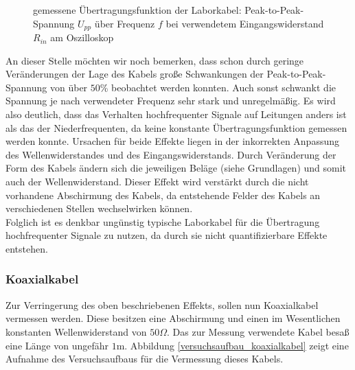 		\begin{figure}[H]
			\center
			
			\caption{\centering gemessene Übertragungsfunktion der Laborkabel: Peak-to-Peak-Spannung $U_{pp}$ über Frequenz $f$ bei verwendetem Eingangswiderstand $R_{in}$ am Oszilloskop} %
			\label{diagramm_laborkabel}
		\end{figure}

		An dieser Stelle möchten wir noch bemerken, dass schon durch geringe Veränderungen der Lage des Kabels große Schwankungen der Peak-to-Peak-Spannung von über $50$\% beobachtet werden konnten.
		Auch sonst schwankt die Spannung je nach verwendeter Frequenz sehr stark und unregelmäßig.
		Es wird also deutlich, dass das Verhalten hochfrequenter Signale auf Leitungen anders ist als das der Niederfrequenten, da keine konstante Übertragungsfunktion gemessen werden konnte.
		Ursachen für beide Effekte liegen in der inkorrekten Anpassung des Wellenwiderstandes und des Eingangswiderstands.
		Durch Veränderung der Form des Kabels ändern sich die jeweiligen Beläge (siehe Grundlagen) und somit auch der Wellenwiderstand.
		Dieser Effekt wird verstärkt durch die nicht vorhandene Abschirmung des Kabels, da entstehende Felder des Kabels an verschiedenen Stellen wechselwirken können. \\

		Folglich ist es denkbar ungünstig typische Laborkabel für die Übertragung hochfrequenter Signale zu nutzen, da durch sie nicht quantifizierbare Effekte entstehen.


	\subsubsection{Koaxialkabel} %
	\label{ssub:koaxialkabel}
	
		Zur Verringerung des oben beschriebenen Effekts, sollen nun Koaxialkabel vermessen werden.
		Diese besitzen eine Abschirmung und einen im Wesentlichen konstanten Wellenwiderstand von $50\Omega$.
		Das zur Messung verwendete Kabel besaß eine Länge von ungefähr $1$m.
		Abbildung \ref{versuchsaufbau_koaxialkabel} zeigt eine Aufnahme des Versuchsaufbaus für die Vermessung dieses Kabels.

